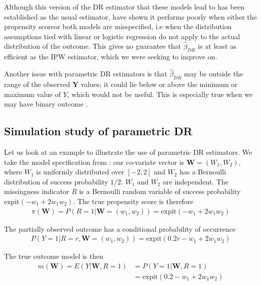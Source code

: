 \documentclass[12pt,twoside]{article}
\newcommand{\expit}{\text{expit}}
\begin{document}
Although this version of the DR estimator that these models lead to has been established as the usual estimator, \cite{kang} have shown it performs poorly when either the propensity scoreor both models are misspecified, i.e when the distribution assumptions tied with linear or logistic regression do not apply to the actual distribution of the outcome. This gives no guarantee that $\hat\beta_{DR}$ is at least as efficient as the IPW estimator, which we were seeking to improve on.

Another issue with parametric DR estimators is that $\hat\beta_{DR}$ may be outside the range of the observed $\mathbf{Y}$ values; it could lie below or above the minimum or maximum value of $Y$, which would not be useful. This is especially true when we may have binary outcome \citep{vansteelandt}.

\subsection{Simulation study of parametric DR}
\label{para_model}

Let us look at an example to illustrate the use of parametric DR estimators. We take the model specification from \citet{benkeser2017}: our co-variate vector is $\mathbf{W} = (W_1, W_2)$, where $W_1$ is uniformly distributed over $[-2,2]$ and $W_2$ has a Bernoulli distribution of success probability $1/2$. $W_1$ and $W_2$ are independent. The missingness indicator $R$ is a Bernoulli random variable of success probability $\expit(-w_1 + 2w_1w_2)$. The true propensity score is therefore
\begin{align*}
    \pi(\mathbf{W}) = P(R = 1 |\mathbf{W} = (w_1,w_2)) = \expit(-w_1 + 2w_1w_2)
\end{align*}

The partially observed outcome has a conditional probability of occurrence 
\begin{align*}
    P(Y = 1|R = r,\mathbf{W} = (w_1, w_2)) = \expit(0.2r - w_1 + 2w_1w_2)
\end{align*}

The true outcome model is then 
\begin{align*}
    m(\mathbf{W}) = E(Y|\mathbf{W}, R=1) &= P(Y = 1|\mathbf{W}, R= 1) \\
    & = \expit(0.2 - w_1 + 2w_1w_2)
\end{align*}
\end{document}
